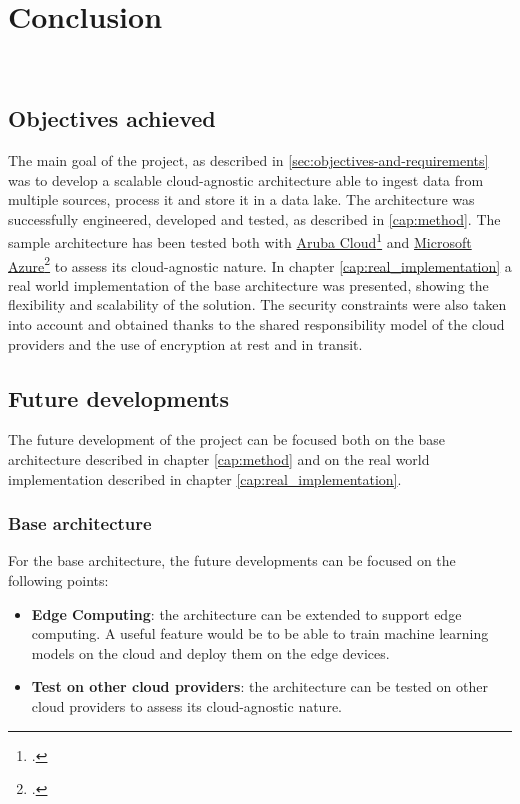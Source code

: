 \chapter{Conclusion}
\label{cap:conclusion}

\\

\section{Objectives achieved}
The main goal of the project, as described in \ref{sec:objectives-and-requirements} was to develop a scalable cloud-agnostic architecture able to ingest data from multiple sources, process it and store it in a data lake. The architecture was successfully engineered, developed and tested, as described in \ref{cap:method}. The sample architecture has been tested both with \href{https://www.arubacloud.com/}{Aruba Cloud}\footcite{site:aruba-cloud} and \href{https://azure.microsoft.com/it-it/}{Microsoft Azure}\footcite{site:azure} to assess its cloud-agnostic nature.
In chapter \ref{cap:real_implementation} a real world implementation of the base architecture was presented, showing the flexibility and scalability of the solution. The security constraints were also taken into account and obtained thanks to the shared responsibility model of the cloud providers and the use of encryption at rest and in transit.\\

\section{Future developments}
The future development of the project can be focused both on the base architecture described in chapter \ref{cap:method} and on the real world implementation described in chapter \ref{cap:real_implementation}.

\subsection{Base architecture}
For the base architecture, the future developments can be focused on the following points:
\begin{itemize}
    \item \textbf{Edge Computing}: the architecture can be extended to support edge computing. A useful feature would be to be able to train machine learning models on the cloud and deploy them on the edge devices.
    \item \textbf{Test on other cloud providers}: the architecture can be tested on other cloud providers to assess its cloud-agnostic nature.
\end{itemize}



